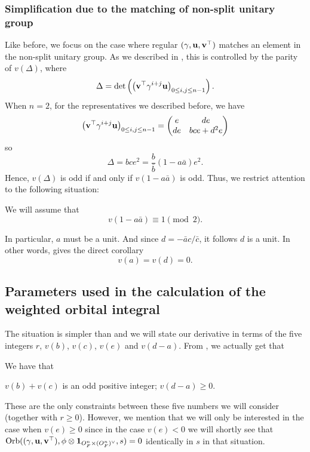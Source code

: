 \subsubsection{Simplification due to the matching of non-split unitary group}
Like before, we focus on the case where regular $(\gamma, \mathbf u, \mathbf v^\top)$
matches an element in the non-split unitary group.
As we described in ,
this is controlled by the parity of $v(\Delta)$, where
\[ \Delta = \det \left( \left( \mathbf v^\top \gamma^{i+j} \mathbf u \right)_{0 \le i,j \le n-1} \right). \]
When $n=2$, for the representatives we described before,
we have
\[ \left( \mathbf v^\top \gamma^{i+j} \mathbf u \right)_{0 \le i,j \le n-1}
  = \begin{pmatrix} e & de \\ de & bce + d^2e \end{pmatrix} \]
so
\[ \Delta = bce^2 = \frac{b}{\bar b}(1-a \bar a) e^2 . \]
Hence, $v(\Delta)$ is odd if and only if $v(1-a \bar a)$ is odd.
Thus, we restrict attention to the following situation:
\begin{assume}
  \label{assume:a_odd}
  We will assume that
  \[ v(1-a \bar a) \equiv 1 \pmod 2. \]
\end{assume}
In particular, $a$ must be a unit.
And since $d = -\bar a c / \bar c$, it follows $d$ is a unit.
In other words,  gives the direct corollary
\[ v(a) = v(d) = 0. \]

\subsection{Parameters used in the calculation of the weighted orbital integral}
The situation is simpler than 
and we will state our derivative in terms of the five integers
$r$, $v(b)$, $v(c)$, $v(e)$ and $v(d-a)$.
From , we actually get that
\begin{assume}
  \label{assume:FJ}
  We have that
  \begin{itemize}
    \ii $v(b) + v(c)$ is an odd positive integer;
    \ii $v(d-a) \ge 0$.
  \end{itemize}
\end{assume}
These are the only constraints between these five numbers we will consider
(together with $r \ge 0$).
However, we mention that we will only be interested in the case when $v(e) \ge 0$
since in the case $v(e) < 0$ we will shortly see that
$\operatorname{Orb}({(\gamma, \mathbf u, \mathbf v^\top)}, \phi \otimes \mathbf{1}_{O_F^n \times (O_F^n)^\vee}, s) = 0$ identically in $s$ in that situation.

